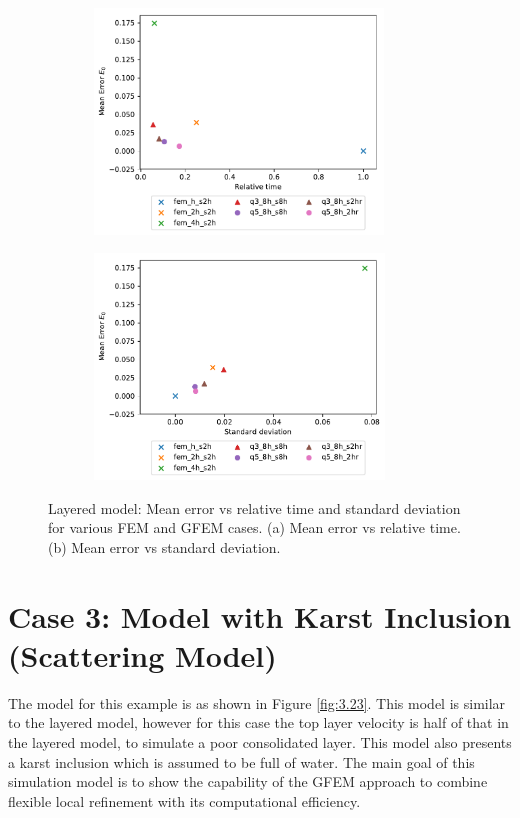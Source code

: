  \begin{figure}[h!]
 		\centering
		\begin{subfigure}{8cm}
				\includegraphics[width=8cm, height=6cm]{Thesis_Edith/figures/layered_model/layer_waves/MeanError_time_layered.pdf}
			     \caption{}
		\end{subfigure}
        \hspace{0.25cm}	
		\begin{subfigure}{8cm}
				\includegraphics[width=8cm, height=6cm]{Thesis_Edith/figures/layered_model/layer_waves/MeanError_std_layered.pdf}
			   \caption{}
		\end{subfigure}
 
	\caption{Layered model: Mean error vs relative time and standard deviation for various FEM and GFEM cases. (a) Mean error vs relative time. (b) Mean error vs standard deviation.}
	\label{fig:3.22}
\end{figure}


 \clearpage
\section{Case 3: Model with Karst Inclusion (Scattering Model)}
The model for this example is as shown in Figure \ref{fig:3.23}. This model is similar to the layered model, however for this case the top layer velocity is half of that in the layered model, to simulate a poor consolidated layer. This model also presents a karst inclusion which is assumed to be full of water. The main goal of this simulation model is to show the capability of the GFEM approach to combine flexible local refinement with its computational efficiency. 

